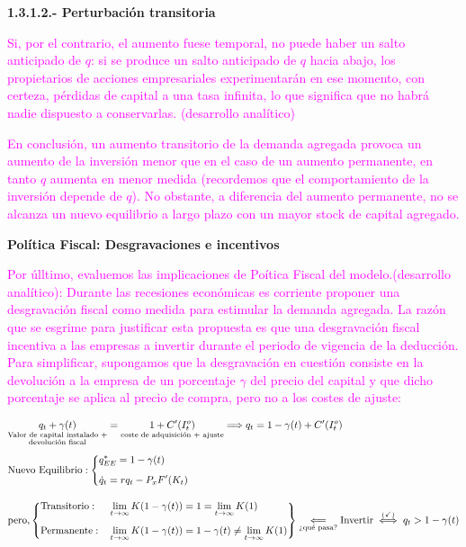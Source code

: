 \documentclass[10pt,a4paper]{article}
\begin{document}
\textbf{1.3.1.2.- Perturbación transitoria}

\textcolor{magenta}{Si, por el contrario, el aumento fuese temporal, no puede haber un salto anticipado de $q$: si se produce un salto anticipado de $q$ hacia abajo, los propietarios de acciones empresariales experimentarán en ese momento, con certeza, pérdidas de capital a una tasa infinita, lo que significa que no habrá nadie dispuesto a conservarlas. (desarrollo analítico)

En conclusión, un aumento transitorio de la demanda agregada provoca un aumento de la inversión menor que en el caso de un aumento permanente, en tanto $q$ aumenta en menor medida (recordemos que el comportamiento de la inversión depende de $q$). No obstante, a diferencia del aumento permanente, no se alcanza un nuevo equilibrio a largo plazo con un mayor stock de capital agregado. 
}

\textbf{Política Fiscal: Desgravaciones e incentivos}

\textcolor{magenta}{Por úlltimo, evaluemos las implicaciones de Poítica Fiscal del modelo.(desarrollo analítico): Durante las recesiones económicas es corriente proponer una desgravación fiscal como medida para estimular la demanda agregada. La razón que se esgrime para justificar esta propuesta es que una desgravación fiscal incentiva a las empresas a invertir durante el periodo de vigencia de la deducción. Para simplificar, supongamos que la desgravación en cuestión consiste en la devolución a la empresa de un porcentaje $\gamma$ del precio del capital y que dicho porcentaje se aplica al precio de compra, pero no a los costes de ajuste:}

$$\begin{aligned}
    &\underset{\substack{\text{\scriptsize Valor de capital instalado +}\\\text{\scriptsize devolución fiscal}}}{q_t+\gamma(t)}=\underset{\text{\scriptsize coste de adquisición + ajuste}}{1+C'(I_t^o)}\Longrightarrow q_t=1-\gamma(t)+C'(I_t^o)\\[0.5em]
    &{\text{Nuevo Equilibrio}}:
    \left\{\begin{aligned}
        &q_{EE}^*=1-\gamma(t)\\[0.5em]
        &\dot q_t=rq_t-P_xF'(K_t)
    \end{aligned}\right.\\[1em]
    &\text{pero,}
    \left\{\begin{aligned}
        &\text{Transitorio}:&&\lim_{t\to\infty}K(1-\gamma(t))=1=\lim_{t\to\infty} K(1)\\[0.5em]
        &\text{Permanente}:&&\lim_{t\to\infty}K(1-\gamma(t))=1-\gamma(t)\neq\lim_{t\to\infty} K(1)
    \end{aligned}\right\}\underset{\text{\scriptsize ¿qué pasa?}}{\Longleftarrow}\text{Invertir}\overset{(\checkmark)}{\iff} q_t>1-\gamma(t)
\end{aligned}$$
\end{document}

